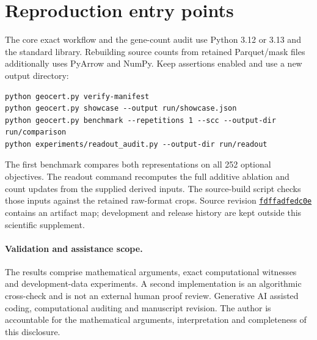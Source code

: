 \documentclass[10pt,letterpaper]{article}
\begin{document}
\section{Reproduction entry points}
The core exact workflow and the gene-count audit use Python 3.12 or 3.13 and the standard library. Rebuilding source counts from retained Parquet/mask files additionally uses PyArrow and NumPy. Keep assertions enabled and use a new output directory:
\begin{verbatim}
python geocert.py verify-manifest
python geocert.py showcase --output run/showcase.json
python geocert.py benchmark --repetitions 1 --scc --output-dir run/comparison
python experiments/readout_audit.py --output-dir run/readout
\end{verbatim}
The first benchmark compares both representations on all 252 optional objectives. The readout command recomputes the full additive ablation and count updates from the supplied derived inputs. The source-build script checks those inputs against the retained raw-format crops. Source revision \href{https://github.com/arnavperam/geocert/tree/fdffadfedc0e21202d554c8425add3349199a766}{\texttt{fdffadfedc0e}} contains an artifact map; development and release history are kept outside this scientific supplement.

\paragraph{Validation and assistance scope.}
The results comprise mathematical arguments, exact computational witnesses and development-data experiments. A second implementation is an algorithmic cross-check and is not an external human proof review. Generative AI assisted coding, computational auditing and manuscript revision. The author is accountable for the mathematical arguments, interpretation and completeness of this disclosure.
\end{document}
